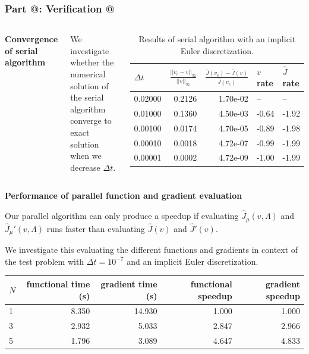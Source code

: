 \documentclass[9pt]{beamer}
\makeatletter
\newcommand*{\rom}[1]{\expandafter\@slowromancap\romannumeral #1@}
\makeatother
\begin{document}
\begin{frame}
\frametitle{\textbf{ Part \rom{5}:} Verification \rom{3}}
\begin{columns}
\textbf{Convergence of serial algorithm}
\begin{itemize}
{\small
\item{We investigate whether the numerical solution of the serial algorithm converge to exact solution when we decrease $\Delta t$.}
}
\end{itemize}
{\tiny
\begin{table}[!h]
\caption{{\tiny Results of serial algorithm with an implicit Euler discretization.}} \label{IE_convergence}
\centering
\begin{tabular}{lrrll}
\toprule
{} $\Delta t$&    $\frac{||v_e-v||_{\infty}}{||v||_{\infty}}$ &  $\frac{\hat J(v_e)-\hat J(v)}{\hat J(v_e)}$ & $v$ rate & $\hat J$  rate \\
\midrule
0.02000 &  0.2126 &  1.70e-02 &        -- &       -- \\
0.01000 &  0.1360 &  4.50e-03 & -0.64 & -1.92 \\
0.00100 &  0.0174 &  4.70e-05 & -0.89 & -1.98 \\
0.00010 &  0.0018 &  4.72e-07 &   -0.99 & -1.99 \\
0.00001 &  0.0002 &  4.72e-09 &  -1.00 & -1.99 \\
\bottomrule
\end{tabular}
\end{table}}
\end{columns}
\textbf{Performance of parallel function and gradient evaluation}
\begin{itemize}
{\small
\item{Our parallel algorithm can only produce a speedup if evaluating $\hat J_{\mu}(v,\Lambda)$ and $\hat J_{\mu}'(v,\Lambda)$ runs faster than evaluating $\hat J(v)$ and $\hat J '(v)$.}
\item{We investigate this evaluating the different functions and gradients in context of the test problem with $\Delta t= 10^{-7}$ and an implicit Euler discretization. }}
\end{itemize}
{\tiny
\begin{table}[!h]
\centering
\begin{tabular}{lrrrr}
\toprule
{}$N$ &  functional time (s) &  gradient time (s) &  functional speedup &  gradient speedup \\
\midrule
1 &           8.350 &         14.930 &            1.000 &          1.000 \\
3 &           2.932 &          5.033 &            2.847 &          2.966 \\
5 &           1.796 &          3.089 &            4.647 &          4.833 \\
\bottomrule
\end{tabular}
\end{table}}
\end{frame}
\end{document}
